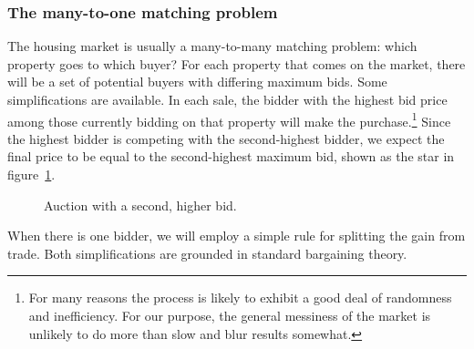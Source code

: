 

\subsubsection{The many-to-one matching problem}
{The housing market is usually a many-to-many matching problem}: which property goes to which buyer? For each property that comes on the market, there will be a set of potential buyers with differing maximum bids. Some simplifications are available. In each sale, the bidder with the highest bid price among those currently bidding on that property will make the purchase.\footnote{For many reasons the process is likely to exhibit a good deal of randomness and inefficiency. For our purpose, the general messiness of the market is unlikely to do more than slow and blur results somewhat.} Since the highest bidder is competing with the second-highest bidder, we expect the final price to be equal to the second-highest maximum bid, shown as the star in figure~\ref{fig:auction-game}. 


    \begin{figure}
        \centering
        
        \caption[Auction with a second, higher bid]{Auction with a second, higher bid.}
        \label{fig:auction-game}
    \end{figure}

When there is one bidder, we will employ a simple rule for splitting the gain from trade. Both simplifications are grounded in standard bargaining theory.

